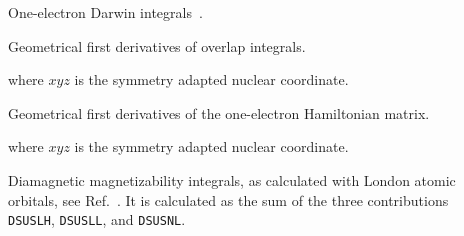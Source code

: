 \begin{description}
\item[] One-electron Darwin integrals~\cite{skjohjajjcp103}.


\item[] Geometrical first derivatives of overlap
integrals.

where $xyz$ is the symmetry adapted nuclear coordinate.

\item[] Geometrical first derivatives of the one-electron
Hamiltonian matrix.

where $xyz$ is the symmetry adapted nuclear coordinate.

\item[] Diamagnetic magnetizability integrals, as
calculated with London atomic orbitals, see
Ref.~\cite{thpjjcp95}. It is calculated as the sum of the three
contributions \verb|DSUSLH|, \verb|DSUSLL|, and \verb|DSUSNL|.



\end{description}
